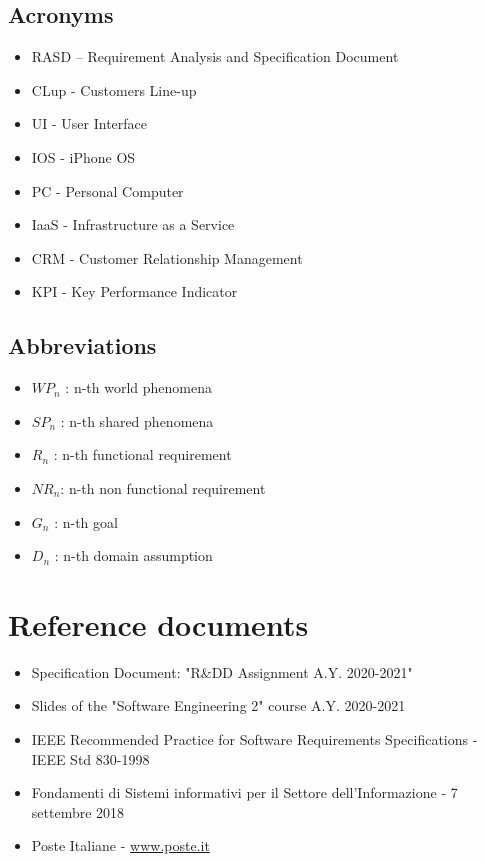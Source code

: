 \documentclass[a4paper,12pt]{report}
\begin{document}
\subsection{Acronyms}
\begin{itemize}
	\item RASD – Requirement Analysis and Specification Document
	\item CLup - Customers Line-up
	\item UI - User Interface
	\item IOS - iPhone OS
	\item PC - Personal Computer
	\item IaaS - Infrastructure as a Service
	\item CRM - Customer Relationship Management
	\item KPI - Key Performance Indicator
\end{itemize}

\subsection{Abbreviations}
\begin{itemize}
	\item  $WP_n$ : n-th world phenomena
	\item  $SP_n$ : n-th shared phenomena
	\item  $R_n$ : n-th functional requirement
	\item  $NR_n$: n-th non functional requirement
	\item  $G_n$ : n-th goal
	\item  $D_n$ : n-th domain assumption
\end{itemize}

\section{Reference documents} \label{Reference documents}
\begin{itemize}
	\item Specification Document: "R\&DD Assignment A.Y. 2020-2021"
	\item Slides of the "Software Engineering 2" course A.Y. 2020-2021
	\item IEEE Recommended Practice for Software Requirements Specifications - IEEE Std 830-1998
	\item  Fondamenti di Sistemi informativi per il Settore dell’Informazione - 7 settembre 2018
	\item Poste Italiane - \url{www.poste.it}
\end{itemize}
\end{document}
